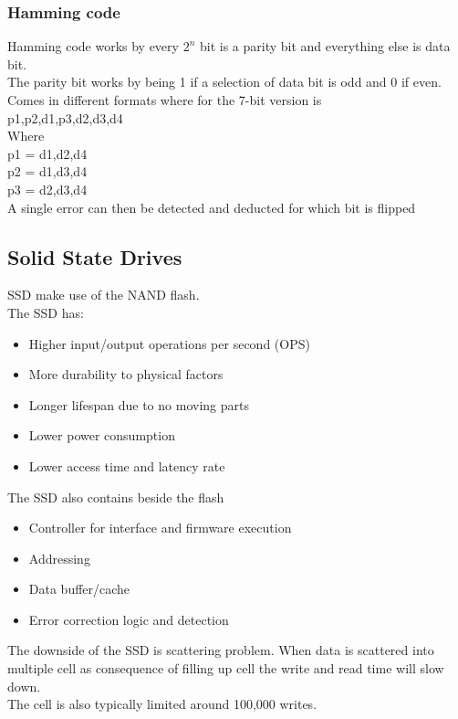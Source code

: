 \documentclass[12pt, a4paper]{article}
\begin{document}
			\subsubsection{Hamming code}
				Hamming code works by every $2^n$ bit is a parity bit and everything else is data bit.\\
				The parity bit works by being 1 if a selection of data bit is odd and 0 if even.\\
				Comes in different formats where for the 7-bit version is\\
				p1,p2,d1,p3,d2,d3,d4\\
				Where \\
				p1 = d1,d2,d4\\
				p2 = d1,d3,d4\\
				p3 = d2,d3,d4\\
				A single error can then be detected and deducted for which bit is flipped
		\subsection{Solid State Drives}
			SSD make use of the NAND flash.\\
			The SSD has:
			\begin{itemize}
				\item Higher input/output operations per second (OPS)
				\item More durability to physical factors
				\item Longer lifespan due to no moving parts
				\item Lower power consumption
				\item Lower access time and latency rate
			\end{itemize}
			The SSD also contains beside the flash
			\begin{itemize}
				\item Controller for interface and firmware execution
				\item Addressing 
				\item Data buffer/cache
				\item Error correction logic and detection
			\end{itemize}
			The downside of the SSD is scattering problem. When data is scattered into multiple cell as consequence of filling up cell the write and read time will slow down.\\
			The cell is also typically limited around 100,000 writes.
\end{document}
